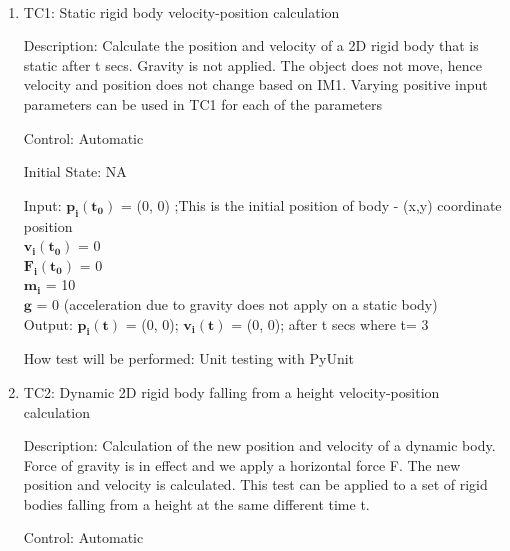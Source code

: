 \documentclass[12pt, titlepage]{article}
\begin{document}
\paragraph{}

\begin{enumerate}

\item{TC1: Static rigid body velocity-position calculation\\}

Description: Calculate the position and velocity of a 2D rigid body that is static after t secs. Gravity is not applied. The object does not move, hence velocity and position does not change based on IM1. Varying positive input parameters can be used in TC1 for each of the parameters

Control: Automatic
					
Initial State: NA
					
Input: $\mathbf{p_i}$$\mathbf{(t_0)}$ = (0, 0) ;This is the initial position of body - (x,y) coordinate position\\
       \hspace*{1.3cm}$\mathbf{v_i}$$\mathbf{(t_0)}$ = 0\\
       \hspace*{1.3cm}$\mathbf{F_i}$$\mathbf{(t_0)}$ = 0\\
       \hspace*{1.3cm}$\mathbf{m_i}$$ \mathbf{}$ = 10\\
       \hspace*{1.3cm}$\mathbf{g}$$\mathbf{}$ = 0 (acceleration due to gravity does not apply on a static body)\\
					
Output:  $\mathbf{p_i}$$\mathbf{(t)}$ = (0, 0);
         $\mathbf{v_i}$$\mathbf{(t)}$ = (0, 0); after t secs where t= 3 
					
How test will be performed: Unit testing with PyUnit
					
\item{TC2: Dynamic 2D rigid body falling from a height velocity-position calculation\\}

Description: Calculation of the new position and velocity of a dynamic body. Force of gravity is in effect and we apply a horizontal force F. The new position and velocity is calculated. This test can be applied to a set of rigid bodies falling from a height at the same different time t.
 
Control: Automatic
					

\end{enumerate}
\end{document}
